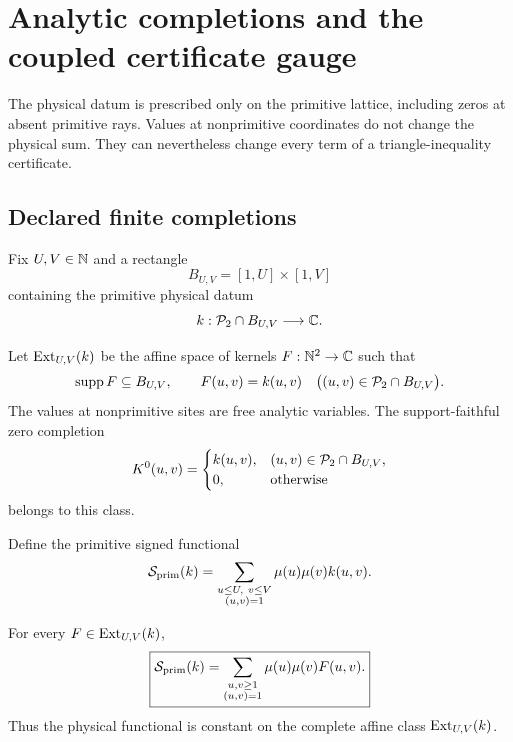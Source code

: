 \section{Analytic completions and the coupled certificate gauge}
\label{sec:completion-gauge}

The physical datum is prescribed only on the primitive lattice, including
zeros at absent primitive rays.  Values at nonprimitive coordinates do not
change the physical sum.  They can nevertheless change every term of a
triangle-inequality certificate.

\subsection{Declared finite completions}

Fix \(U,V\in\mathbb N\) and a rectangle
\[
 B_{U,V}=[1,U]\times[1,V]
\]
containing the primitive physical datum
\[
 k:\mathcal P_2\cap B_{U,V}\longrightarrow\mathbb C.
\]

\begin{definition}
\label{def:completion-class}
Let \(\operatorname{Ext}_{U,V}(k)\) be the affine space of kernels
\(F:\mathbb N^2\to\mathbb C\) such that
\[
 \operatorname{supp} F\subseteq B_{U,V},
 \qquad
 F(u,v)=k(u,v)
 \quad\bigl((u,v)\in\mathcal P_2\cap B_{U,V}\bigr).
\]
The values at nonprimitive sites are free analytic variables.  The
support-faithful zero completion
\[
 K^0(u,v)=
 \begin{cases}
  k(u,v),&(u,v)\in\mathcal P_2\cap B_{U,V},\\
  0,&\text{otherwise}
 \end{cases}
\]
belongs to this class.
\end{definition}

Define the primitive signed functional
\begin{equation}
 \mathcal S_{\rm prim}(k)
 =
 \sum_{\substack{u\le U,\ v\le V\\(u,v)=1}}
 \mu(u)\mu(v)k(u,v).
 \label{eq:primitive-functional}
\end{equation}

\begin{theorem}
\label{thm:completion-invariance}
For every \(F\in\operatorname{Ext}_{U,V}(k)\),
\begin{equation}
 \boxed{
 \mathcal S_{\rm prim}(k)
 =
 \sum_{\substack{u,v\ge1\\(u,v)=1}}
 \mu(u)\mu(v)F(u,v).}
 \label{eq:completion-invariance}
\end{equation}
Thus the physical functional is constant on the complete affine class
\(\operatorname{Ext}_{U,V}(k)\).
\end{theorem}

